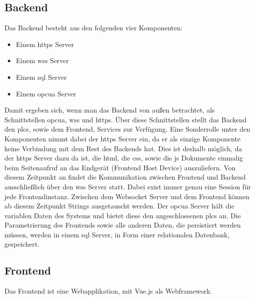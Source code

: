 \subsection{Backend}\label{subsec:archBackend}
Das Backend besteht aus den folgenden vier Komponenten:
 \begin{itemize}
  \item Einem \ac{https} Server
  \item Einem \ac{wss} Server 
  \item Einem \ac{sql} Server
  \item Einem \ac{opcua} Server 
\end{itemize}
Damit ergeben sich, wenn man das Backend von außen betrachtet, als Schnittstellen \ac{opcua}, \ac{wss} und \ac{https}.
Über diese Schnittstellen stellt das Backend den \acp{plc}, sowie dem Frontend, Services zur Verfügung.
Eine Sonderrolle unter den Komponenten nimmt dabei der \ac{https} Server ein, 
da er als einzige Komponente keine Verbindung mit dem Rest des Backends hat.
Dies ist deshalb möglich, da der \ac{https} Server dazu da ist, die \ac{html}, die \ac{css}, sowie die \ac{js} Dokumente 
einmalig beim Seitenaufruf an das Endgerät (Frontend Host Device) auszuliefern.
Von diesem Zeitpunkt an findet die Kommunikation zwischen Frontend und Backend ausschließlich über den \ac{wss} Server statt.
Dabei exist immer genau eine Session für jede Frontendinstanz.%
Zwischen dem Websocket Server und dem Frontend können ab diesem Zeitpunkt Strings ausgetauscht werden.
Der \ac{opcua} Server hält die variablen Daten des Systems und bietet diese den angeschlossenen \acp{plc} an.
Die Parametrierung des Frontends sowie alle anderen Daten, die persistiert werden müssen, 
werden in einem \ac{sql} Server, in Form einer relationalen Datenbank, gespeichert.

\subsection{Frontend}\label{subsec:archFrontend}
Das Frontend ist eine Webapplikation, mit Vue.js als Webframework.%

